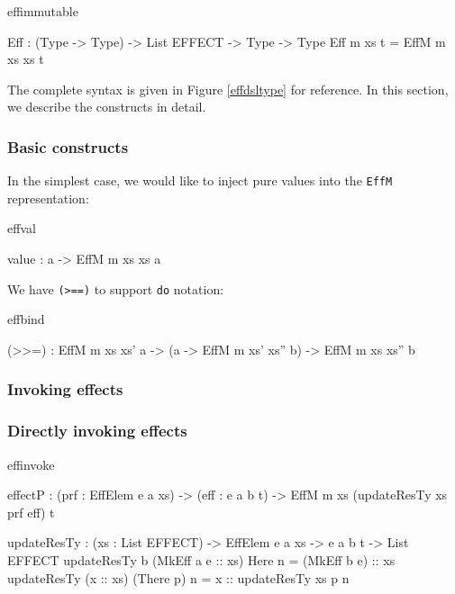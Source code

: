 \begin{SaveVerbatim}{effimmutable}

Eff : (Type -> Type) -> List EFFECT -> Type -> Type
Eff m xs t = EffM m xs xs t

\end{SaveVerbatim}

\noindent
The complete syntax is given in Figure \ref{effdsltype} for reference. In this
section, we describe the constructs in detail.

\subsubsection{Basic constructs}

In the simplest case, we would like to inject pure values into the
\texttt{EffM} representation:

\begin{SaveVerbatim}{effval}

value : a -> EffM m xs xs a

\end{SaveVerbatim}

We have \texttt{(>==)} to support \texttt{do} notation:

\begin{SaveVerbatim}{effbind}

(>>=) : EffM m xs xs' a -> 
        (a -> EffM m xs' xs'' b) -> EffM m xs xs'' b

\end{SaveVerbatim}

\subsubsection{Invoking effects}

\subsubsection*{Directly invoking effects}

\begin{SaveVerbatim}{effinvoke}

effectP : (prf : EffElem e a xs) -> (eff : e a b t) -> 
          EffM m xs (updateResTy xs prf eff) t

\end{SaveVerbatim}

\begin{SaveVerbatim}{}

updateResTy : (xs : List EFFECT) -> 
              EffElem e a xs -> e a b t -> List EFFECT
updateResTy {b} (MkEff a e :: xs) Here      n 
                 = (MkEff b e) :: xs
updateResTy     (x :: xs)         (There p) n 
                 = x :: updateResTy xs p n

\end{SaveVerbatim}
\useverb{}

